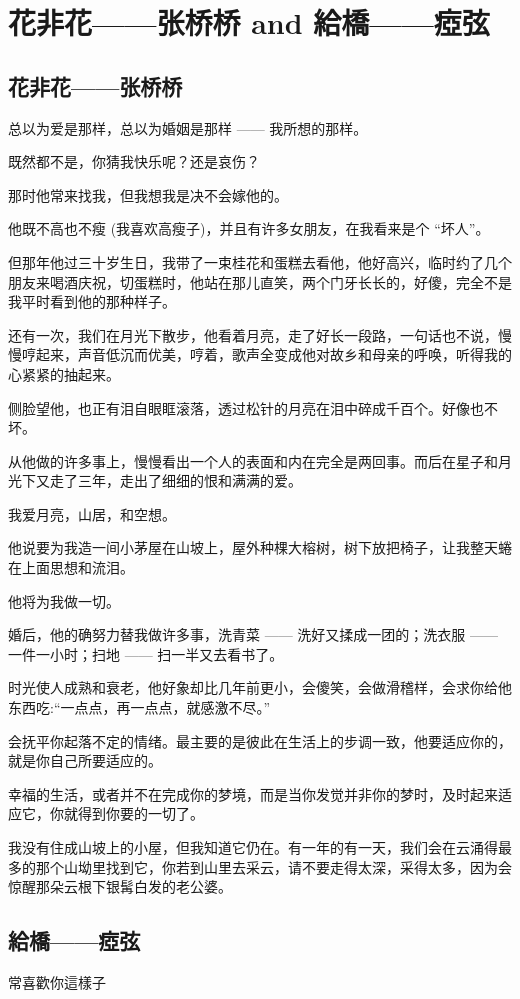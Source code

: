 \section{ 花非花——张桥桥 and 給橋——瘂弦}
\subsection{ 花非花——张桥桥}
总以为爱是那样，总以为婚姻是那样 —— 我所想的那样。

既然都不是，你猜我快乐呢？还是哀伤？


那时他常来找我，但我想我是决不会嫁他的。

他既不高也不瘦 (我喜欢高瘦子)，并且有许多女朋友，在我看来是个 “坏人”。

但那年他过三十岁生日，我带了一束桂花和蛋糕去看他，他好高兴，临时约了几个朋友来喝酒庆祝，切蛋糕时，他站在那儿直笑，两个门牙长长的，好傻，完全不是我平时看到他的那种样子。

还有一次，我们在月光下散步，他看着月亮，走了好长一段路，一句话也不说，慢慢哼起来，声音低沉而优美，哼着，歌声全变成他对故乡和母亲的呼唤，听得我的心紧紧的抽起来。

侧脸望他，也正有泪自眼眶滚落，透过松针的月亮在泪中碎成千百个。好像也不坏。

从他做的许多事上，慢慢看出一个人的表面和内在完全是两回事。而后在星子和月光下又走了三年，走出了细细的恨和满满的爱。


我爱月亮，山居，和空想。

他说要为我造一间小茅屋在山坡上，屋外种棵大榕树，树下放把椅子，让我整天蜷在上面思想和流泪。

他将为我做一切。

婚后，他的确努力替我做许多事，洗青菜 —— 洗好又揉成一团的；洗衣服 —— 一件一小时；扫地 —— 扫一半又去看书了。

时光使人成熟和衰老，他好象却比几年前更小，会傻笑，会做滑稽样，会求你给他东西吃:“一点点，再一点点，就感激不尽。”

会抚平你起落不定的情绪。最主要的是彼此在生活上的步调一致，他要适应你的，就是你自己所要适应的。

幸福的生活，或者并不在完成你的梦境，而是当你发觉并非你的梦时，及时起来适应它，你就得到你要的一切了。

我没有住成山坡上的小屋，但我知道它仍在。有一年的有一天，我们会在云涌得最多的那个山坳里找到它，你若到山里去采云，请不要走得太深，采得太多，因为会惊醒那朵云根下银髯白发的老公婆。


\subsection{給橋——瘂弦}
常喜歡你這樣子

